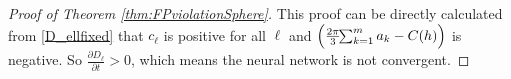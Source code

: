\documentclass[10pt,a4paper]{amsart}
\begin{document}
\begin{proof}[Proof of Theorem \ref{thm:FPviolationSphere}]
    This proof can be directly calculated from \eqref{D_ellfixed} that $c_{\ell}$ is positive for all $\ell$ and $\Bigl(\tfrac{2\pi}{3}\!\!\sum_{k=1}^m a_k - C(h)\Bigr)$ is negative. So $\frac{\partial D_{\ell}}{\partial t} > 0$, which means the neural network is not convergent.




\end{proof}
\end{document}
